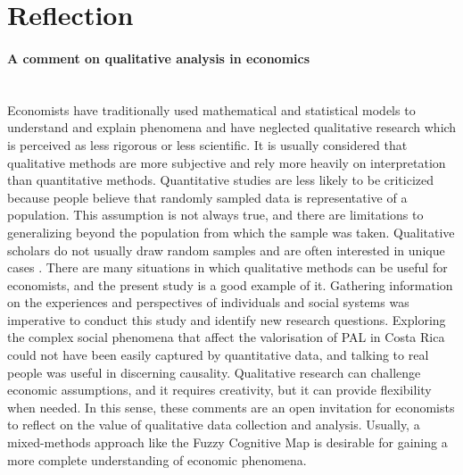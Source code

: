 \section{Reflection}

\paragraph{A comment on qualitative analysis in economics} \mbox{}\\
Economists have traditionally used mathematical and statistical models to understand and explain phenomena and have neglected qualitative research which is perceived as less rigorous or less scientific. It is usually considered that qualitative methods are more subjective and rely more heavily on interpretation than quantitative methods. Quantitative studies are less likely to be criticized because people believe that randomly sampled data is representative of a population. This assumption is not always true, and there are limitations to generalizing beyond the population from which the sample was taken. Qualitative scholars do not usually draw random samples and are often interested in unique cases \citep{rubin2021rocking}. There are many situations in which qualitative methods can be useful for economists, and the present study is a good example of it. Gathering information on the experiences and perspectives of individuals and social systems was imperative to conduct this study and identify new research questions. Exploring the complex social phenomena that affect the valorisation of PAL in Costa Rica could not have been easily captured by quantitative data, and talking to real people was useful in discerning causality. Qualitative research can challenge economic assumptions, and it requires creativity, but it can provide flexibility when needed. In this sense, these comments are an open invitation for economists to reflect on the value of qualitative data collection and analysis. Usually, a mixed-methods approach like the Fuzzy Cognitive Map is desirable for gaining a more complete understanding of economic phenomena.

